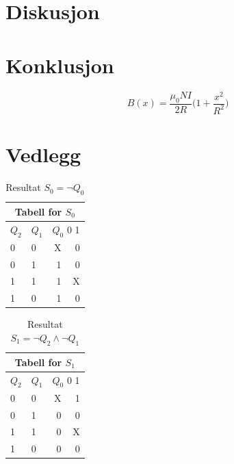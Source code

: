\documentclass[12pt,norsk,a4paper]{article}
\begin{document}
\section{Diskusjon}
\clearpage

\section{Konklusjon}
        \begin{equation} %
            \label{eq:magnetfelt-spole} %
            B(x) = \frac{\mu_0 N I}{2R} \Bigg(1 + \frac{x^2}{R^2} \Bigg) 
        \end{equation}
\clearpage

\section{Vedlegg}

\begin{table}[H]
\begin{center}
\begin{tabular}{|l|l|r|r|} \hline
\multicolumn{4}{|c|}{Tabell for $S_0$} \\ \hline
$Q_2$ & $Q_1$ & \multicolumn{2}{|r|}{$Q_0$ \hspace{20 mm} 0 \hspace{2 mm} 1} \\ \hline
0 & 0 & \hspace{27 mm} X \cellcolor[gray]{0.8} & 0 \\ \hline 
0 & 1 & 1 \cellcolor[gray]{0.8} & 0 \\ \hline
1 & 1 & 1 \cellcolor[gray]{0.8} & X \\ \hline
1 & 0 & 1 \cellcolor[gray]{0.8} & 0 \\ \hline
\end{tabular}
\end{center}
\caption{Resultat $S_0=\neg Q_0$}
\end{table}


\begin{table}[H]
\begin{center}
\begin{tabular}{|l|l|r|r|} \hline
\multicolumn{4}{|c|}{Tabell for $S_1$} \\ \hline
$Q_2$ & $Q_1$ & \multicolumn{2}{|r|}{$Q_0$ \hspace{20 mm} 0 \hspace{2 mm} 1} \\ \hline
0 & 0 & \hspace{27 mm} X \cellcolor[gray]{0.8} & \cellcolor[gray]{0.8} 1 \\ \hline 
0 & 1 & 0 & 0 \\ \hline
1 & 1 & 0 & X \\ \hline
1 & 0 & 0 & 0 \\ \hline
\end{tabular}
\end{center}
\caption{Resultat $S_1=\neg Q_2 \wedge \neg Q_1$}
\end{table}
\end{document}
